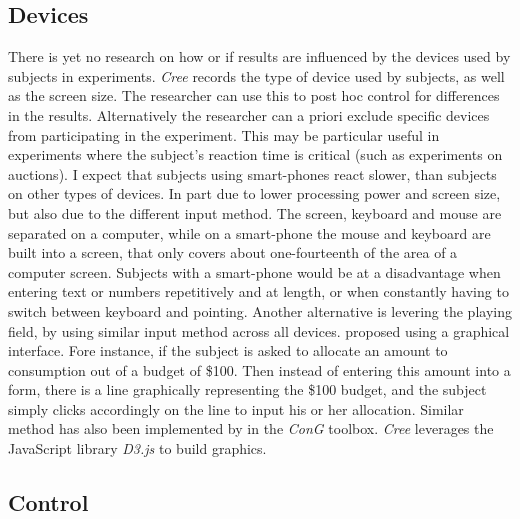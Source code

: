 \documentclass[preprint, 12pt]{elsarticle}
\newcommand{\Cree}{\emph{Cree}\xspace}
\begin{document}
\subsection{Devices}

There is yet no research on how or if results are influenced by the devices used by subjects in experiments. \Cree records the type of device used by subjects, as well as the screen size. The researcher can use this to post hoc control for differences in the results. Alternatively the researcher can a priori exclude specific devices from participating in the experiment. This may be particular useful in experiments where the subject's reaction time is critical (such as experiments on auctions). I expect that subjects using smart-phones react slower, than subjects on other types of devices. In part due to lower processing power and screen size, but also due to the different input method. The screen, keyboard and mouse are separated on a computer, while on a smart-phone the mouse and keyboard are built into a screen, that only covers about one-fourteenth of the area of a computer screen. Subjects with a smart-phone would be at a disadvantage when entering text or numbers repetitively and at length, or when constantly having to switch between keyboard and pointing. Another alternative is levering the playing field, by using similar input method across all devices. \cite{Choi_Fisman_Gale_Kariv_2007} proposed using a graphical interface. Fore instance, if the subject is asked to allocate an amount to consumption out of a budget of \$100. Then instead of entering this amount into a form, there is a line graphically representing the \$100 budget, and the subject simply clicks accordingly on the line to input his or her allocation. Similar method has also been implemented by \cite{Pettit_Friedman_Kephart_Oprea_2014} in the \emph{ConG} toolbox. \Cree leverages the JavaScript library \emph{D3.js} to build graphics.

\subsection{Control}
\end{document}
